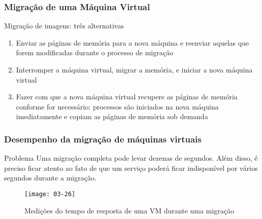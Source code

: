 \documentclass[Ligatures=TeX,table,brazil,svgnames,usetotalslideindicator,compress,10pt]{beamer}
\begin{document}
\begin{frame}
  \frametitle{Migração de uma Máquina Virtual}
  \begin{block}{Migração de imagens: três alternativas}
    \begin{enumerate}
    \item Enviar as páginas de memória para a nova máquina e reenviar aquelas que forem modificadas durante o processo de migração
    \item Interromper a máquina virtual, migrar a memória, e iniciar a nova máquina virtual
    \item Fazer com que a nova máquina virtual recupere as páginas de memória conforme for necessário: processos são iniciados na nova máquina imediatamente e copiam as páginas de memória sob demanda
    \end{enumerate}
  \end{block}
\end{frame}

\begin{frame}
  \frametitle{Desempenho da migração de máquinas virtuais}
  \begin{block}{Problema}
    Uma migração completa pode levar dezenas de segundos. Além disso, é preciso ficar atento ao fato de que um serviço poderá ficar indisponível por vários segundos durante a migração.
  \end{block}

  \begin{figure}
    \centering
    \texttt{[image: 03-26]}
    \caption{Medições do tempo de resposta de uma VM durante uma migração}
  \end{figure}
\end{frame}
\end{document}
